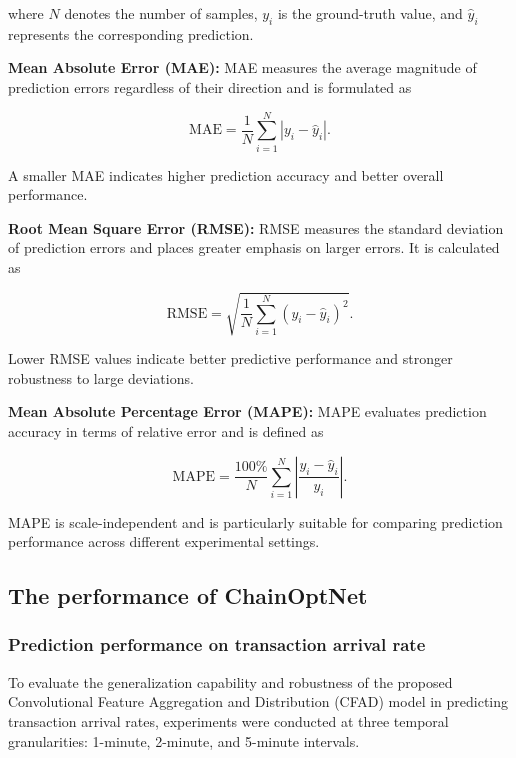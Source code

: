 \documentclass[a4paper,fleqn]{cas-dc}
\begin{document}
where $N$ denotes the number of samples, $y_i$ is the ground-truth value, and $\hat{y}_i$ represents the corresponding prediction.

\textbf{Mean Absolute Error (MAE):}
MAE measures the average magnitude of prediction errors regardless of their direction and is formulated as

\begin{equation}
	\mathrm{MAE}=\frac{1}{N}\sum_{i=1}^{N}|y_i-\hat{y}_i|.
\end{equation}

A smaller MAE indicates higher prediction accuracy and better overall performance.

\textbf{Root Mean Square Error (RMSE):}
RMSE measures the standard deviation of prediction errors and places greater emphasis on larger errors. It is calculated as

\begin{equation}
	\mathrm{RMSE}=
	\sqrt{
		\frac{1}{N}
		\sum_{i=1}^{N}
		(y_i-\hat{y}_i)^2
	}.
\end{equation}

Lower RMSE values indicate better predictive performance and stronger robustness to large deviations.

\textbf{Mean Absolute Percentage Error (MAPE):}
MAPE evaluates prediction accuracy in terms of relative error and is defined as

\begin{equation}
	\mathrm{MAPE}
	=
	\frac{100\%}{N}
	\sum_{i=1}^{N}
	\left|
	\frac{y_i-\hat{y}_i}{y_i}
	\right|.
\end{equation}

MAPE is scale-independent and is particularly suitable for comparing prediction performance across different experimental settings.


\subsection{The performance of ChainOptNet}
\vspace{6pt}
\subsubsection{Prediction performance on transaction arrival rate}
\vspace{6pt}
To evaluate the generalization capability and robustness of the proposed Convolutional Feature Aggregation and Distribution (CFAD) model in predicting transaction arrival rates, experiments were conducted at three temporal granularities: 1-minute, 2-minute, and 5-minute intervals.
\end{document}
